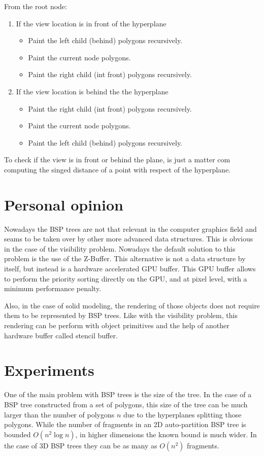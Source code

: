 \documentclass{article}
\begin{document}
From the root node:
\begin{enumerate}
\item If the view location is in front of the hyperplane
\begin{itemize}
\item Paint the left child (behind) polygons recursively.
\item Paint the current node polygons. 
\item Paint the right child (int front) polygons recursively.
\end{itemize}
\item If the view location is behind the the hyperplane
\begin{itemize}
\item Paint the right child (int front) polygons recursively.
\item Paint the current node polygons. 
\item Paint the left child (behind) polygons recursively.
\end{itemize}
\end{enumerate}

To check if the view is in front or behind the plane, is just a matter com computing the singed distance of a point with respect of the hyperplane.

\section*{Personal opinion}
Nowadays the BSP trees are not that relevant in the computer graphics field and seams to be taken over by other more advanced data structures. This is obvious in the case of the visibility problem. Nowadays the default solution to this problem is the use of the Z-Buffer. This alternative is not a data structure by itself, but instead is a hardware accelerated GPU buffer. This GPU buffer allows to perform the priority sorting directly on the GPU, and at pixel level, with a minimum performance penalty.

Also, in the case of solid modeling, the rendering of those objects does not require them to be represented by BSP trees. Like with the visibility problem, this rendering can be perform with  object primitives and the help of another hardware buffer called stencil buffer.

\section*{Experiments}
One of the main problem with BSP trees is the size of the tree. In the case of a BSP tree constructed from a set of polygons, this size of the tree can be much larger than the number of polygons $n$ due to the hyperplanes splitting those polygons. While the number of fragments in an 2D auto-partition BSP tree is bounded $O(n^2 \log n)$, in higher dimensions the known bound is much wider. In the case of 3D BSP trees they can be as many as $O(n^2)$ fragments.
\end{document}
